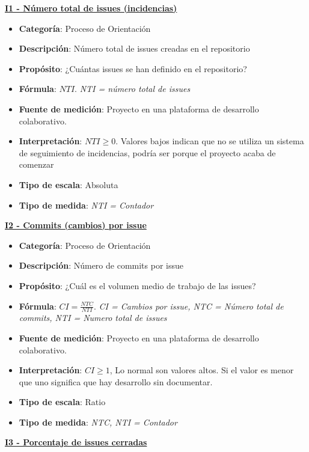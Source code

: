 \textbf{\underline{I1 - Número total de issues (incidencias)}}

\begin{itemize}
	\item \textbf{Categoría}: Proceso de Orientación
	\item \textbf{Descripción}: Número total de issues creadas en el repositorio
	\item \textbf{Propósito}: ¿Cuántas issues se han definido en el repositorio?
	\item \textbf{Fórmula}: $NTI$. \textit{NTI = número total de issues}
	\item \textbf{Fuente de medición}: Proyecto en una plataforma de desarrollo colaborativo.
	\item \textbf{Interpretación}: $NTI \geq 0$. Valores bajos indican que no se utiliza un sistema de seguimiento de incidencias, podría ser porque el proyecto acaba de comenzar
	\item \textbf{Tipo de escala}: Absoluta
	\item \textbf{Tipo de medida}: \textit{NTI = Contador}
\end{itemize}

\textbf{\underline{I2 - Commits (cambios) por issue}}

\begin{itemize}
	\item \textbf{Categoría}: Proceso de Orientación
	\item \textbf{Descripción}: Número de commits por issue
	\item \textbf{Propósito}: ¿Cuál es el volumen medio de trabajo de las issues?
	\item \textbf{Fórmula}: $CI = \frac{NTC}{NTI}$. \textit{CI = Cambios por issue, NTC = Número total de commits, NTI = Numero total de issues}
	\item \textbf{Fuente de medición}: Proyecto en una plataforma de desarrollo colaborativo.
	\item \textbf{Interpretación}: $CI \geq 1$, Lo normal son valores altos. Si el valor es menor que uno significa que hay desarrollo sin documentar.
	\item \textbf{Tipo de escala}: Ratio 
	\item \textbf{Tipo de medida}: \textit{NTC, NTI = Contador}
\end{itemize}

\textbf{\underline{I3 - Porcentaje de issues cerradas}}

